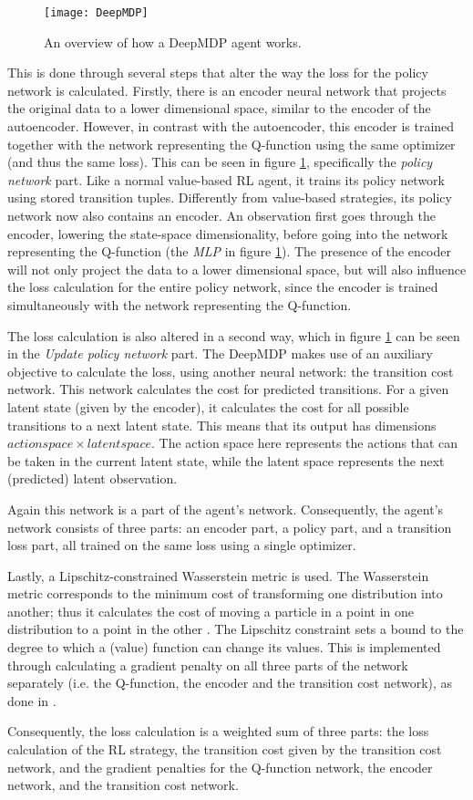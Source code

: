 \begin{figure}[h]
    \centering
    \texttt{[image: DeepMDP]}
    \caption{An overview of how a DeepMDP agent works.}
    \label{fig:deepmdp_agent}
\end{figure}

This is done through several steps that alter the way the loss for the policy network is calculated. Firstly, there is an encoder neural network that projects the original data to a lower dimensional space, similar to the encoder of the autoencoder. However, in contrast with the autoencoder, this encoder is trained together with the network representing the Q-function using the same optimizer (and thus the same loss). This can be seen in figure \ref{fig:deepmdp_agent}, specifically the \textit{policy network} part. Like a normal value-based RL agent, it trains its policy network using stored transition tuples. Differently from value-based strategies, its policy network now also contains an encoder. An observation first goes through the encoder, lowering the state-space dimensionality, before going into the network representing the Q-function (the \textit{MLP} in figure \ref{fig:deepmdp_agent}). The presence of the encoder will not only project the data to a lower dimensional space, but will also influence the loss calculation for the entire policy network, since the encoder is trained simultaneously with the network representing the Q-function. 

The loss calculation is also altered in a second way, which in figure \ref{fig:deepmdp_agent} can be seen in the \textit{Update policy network} part. The DeepMDP makes use of an auxiliary objective to calculate the loss, using another neural network: the transition cost network. This network calculates the cost for predicted transitions. For a given latent state (given by the encoder), it calculates the cost for all possible transitions to a next latent state. This means that its output has dimensions $action space \times latent space$. The action space here represents the actions that can be taken in the current latent state, while the latent space represents the next (predicted) latent observation.

Again this network is a part of the agent's network. Consequently, the agent's network consists of three parts: an encoder part, a policy part, and a transition loss part, all trained on the same loss using a single optimizer.

Lastly, a Lipschitz-constrained Wasserstein metric is used. The Wasserstein metric corresponds to the minimum cost of transforming one distribution into another; thus it calculates the cost of moving a particle in a point in one distribution to a point in the other \cite{deepmdp}. The Lipschitz constraint sets a bound to the degree to which a (value) function can change its values. This is implemented through calculating a gradient penalty on all three parts of the network separately (i.e. the Q-function, the encoder and the transition cost network), as done in \cite{wgan}.

Consequently, the loss calculation is a weighted sum of three parts: the loss calculation of the RL strategy, the transition cost given by the transition cost network, and the gradient penalties for the Q-function network, the encoder network, and the transition cost network.
